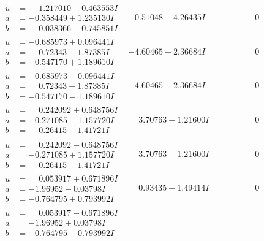 \documentclass[1p]{elsarticle_modified}
\theoremstyle{definition}
\begin{document}
$$\begin{array}{c|c|c}
\begin{aligned}
u &= \phantom{-}1.217010 - 0.463553 I \\
a &= -0.358449 + 1.235130 I \\
b &= \phantom{-}0.038366 - 0.745851 I\end{aligned}
 & -0.51048 - 4.26435 I & \phantom{-0.000000 } 0 \\ \hline\begin{aligned}
u &= -0.685973 + 0.096441 I \\
a &= \phantom{-}0.72343 - 1.87385 I \\
b &= -0.547170 + 1.189610 I\end{aligned}
 & -4.60465 + 2.36684 I & \phantom{-0.000000 } 0 \\ \hline\begin{aligned}
u &= -0.685973 - 0.096441 I \\
a &= \phantom{-}0.72343 + 1.87385 I \\
b &= -0.547170 - 1.189610 I\end{aligned}
 & -4.60465 - 2.36684 I & \phantom{-0.000000 } 0 \\ \hline\begin{aligned}
u &= \phantom{-}0.242092 + 0.648756 I \\
a &= -0.271085 - 1.157720 I \\
b &= \phantom{-}0.26415 + 1.41721 I\end{aligned}
 & \phantom{-}3.70763 - 1.21600 I & \phantom{-0.000000 } 0 \\ \hline\begin{aligned}
u &= \phantom{-}0.242092 - 0.648756 I \\
a &= -0.271085 + 1.157720 I \\
b &= \phantom{-}0.26415 - 1.41721 I\end{aligned}
 & \phantom{-}3.70763 + 1.21600 I & \phantom{-0.000000 } 0 \\ \hline\begin{aligned}
u &= \phantom{-}0.053917 + 0.671896 I \\
a &= -1.96952 - 0.03798 I \\
b &= -0.764795 + 0.793992 I\end{aligned}
 & \phantom{-}0.93435 + 1.49414 I & \phantom{-0.000000 } 0 \\ \hline\begin{aligned}
u &= \phantom{-}0.053917 - 0.671896 I \\
a &= -1.96952 + 0.03798 I \\
b &= -0.764795 - 0.793992 I\end{aligned}

\end{array}$$
\end{document}

